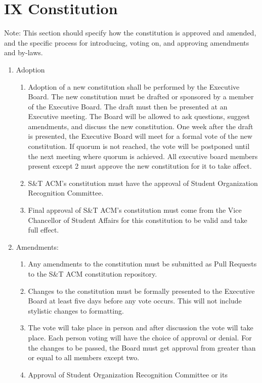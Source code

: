 
\section{IX \textendash{} Constitution}
Note:  This section should specify how the constitution is approved and amended,
and the specific process for introducing, voting on, and approving amendments
and by-laws.
\begin{enumerate}
  \item Adoption
    \begin{enumerate}
      \item Adoption of a new constitution shall be performed by the Executive
        Board. The new constitution must be drafted or sponsored by a member of
        the Executive Board. The draft must then be presented at an Executive
        meeting. The Board will be allowed to ask questions, suggest amendments,
        and discuss the new constitution. One week after the draft is presented,
        the Executive Board will meet for a formal vote of the new constitution.
        If quorum is not reached, the vote will be postponed until the next
        meeting where quorum is achieved. All executive board members present
        except 2 must approve the new constitution for it to take affect.
      \item	S\&T ACM’s constitution must have the approval of Student
        Organization Recognition Committee.
      \item	Final approval of S\&T ACM’s constitution must come from the Vice
        Chancellor of Student Affairs for this constitution to be valid and take
        full effect.
    \end{enumerate}
  \item	Amendments:
    \begin{enumerate}
      \item Any amendments to the constitution must be submitted as Pull
      Requests to the S\&T ACM constitution repository.
      \item Changes to the constitution must be formally presented to the
      Executive Board at least five days before any vote occurs. This will not
      include stylistic changes to formatting.
      \item The vote will take place in person and after discussion the vote
        will take place. Each person voting will have the choice of approval or
        denial. For the changes to be passed, the Board must get approval from
        greater than or equal to all members except two.
      \item	Approval of Student Organization Recognition Committee or its

\end{enumerate}
\end{enumerate}
